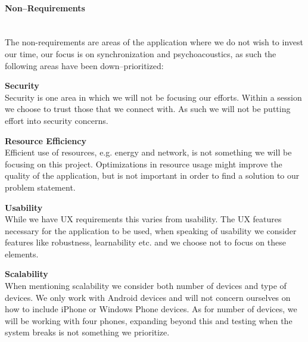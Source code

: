 \paragraph{Non--Requirements} \hfill\\
The non-requirements are areas of the application where we do not wish to invest our time, our focus is on synchronization and psychoacoustics, as such the following areas have been down--prioritized:
\begin{eromanrate}
    \item \textbf{Security} \hfill\\
    Security is one area in which we will not be focusing our efforts.
    Within a session we choose to trust those that we connect with.
    As such we will not be putting effort into security concerns.
    \item \textbf{Resource Efficiency} \hfill\\
    Efficient use of resources, e.g. energy and network, is not something we will be focusing on this project.
    Optimizations in resource usage might improve the quality of the application, but is not important in order to find a solution to our problem statement.
    \item \textbf{Usability} \hfill\\
    While we have \ac{UX} requirements this varies from usability.
    The \ac{UX} features necessary for the application to be used, when speaking of usability we consider features like robustness, learnability etc. and we choose not to focus on these elements.
    \item \textbf{Scalability} \hfill\\
    When mentioning scalability we consider both number of devices and type of devices.
    We only work with Android devices and will not concern ourselves on how to include iPhone or Windows Phone devices.
    As for number of devices, we will be working with four phones, expanding beyond this and testing when the system breaks is not something we prioritize.
\end{eromanrate}
